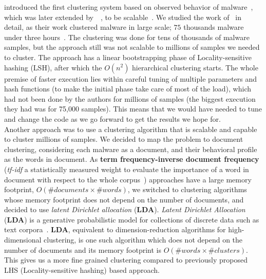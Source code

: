 \citeauthor{bailey} introduced the first clustering system based on observed behavior of malware~\cite[]{bailey}, which was later extended by~\citeauthor{bayer}~\cite[]{bayer}, to be scalable~\cite[]{rieck2009automatic}.
We studied the work of~\citeauthor{bayer} in detail, as their work clustered malware in large scale; $75$ thousands malware under three hours~\cite[]{bayer}.
The clustering was done for tens of thousands of malware samples, but the approach still was not scalable to millions of samples we needed to cluster.
The approach has a linear bootstrapping phase of Locality-sensitive hashing (LSH), after which the $O(n^2)$ hierarchical clustering starts.
The whole premise of faster execution lies within careful tuning of multiple parameters and hash functions (to make the initial phase take care of most of the load), which had not been done by the authors for millions of samples (the biggest execution they had was for 75,000 samples).
This means that we would have needed to tune and change the code as we go forward to get the results we hope for.
\\
Another approach was to use a clustering algorithm that is scalable and capable to cluster millions of samples.
We decided to map the problem to document clustering, considering each malware as a document, and their behavioral profile as the words in document.
As \textbf{term frequency-inverse document frequency} (\emph{tf-idf} a statistically measured weight to evaluate the importance of a word in document with respect to the whole corpus~\cite[]{tfidf}) approaches have a large memory footprint, $O(\#documents \times \#words)$, we switched to clustering algorithms whose memory footprint does not depend on the number of documents, and decided to use \textit{latent Dirichlet allocation} (\textbf{LDA}).
\textit{Latent Dirichlet Allocation} (\textbf{LDA}) is a generative probabilistic model for collections of discrete data such as text corpora~\cite[LDA]{Blei}.
\textbf{LDA}, equivalent to dimension-reduction algorithms for high-dimensional clustering, is one such algorithm which does not depend on the number of documents and its memory footprint is $O(\#words\times \#clusters)$.
This gives us a more fine grained clustering compared to previously proposed LHS (Locality-sensitive hashing) based approach.\\

